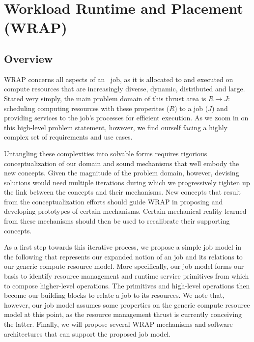 \section{Workload Runtime and Placement (WRAP)}

\subsection{Overview}

WRAP concerns all aspects
of an \ngrm\ job, as it is allocated to and executed on compute resources
that are increasingly diverse, dynamic, distributed and large.
Stated very simply, the main problem domain of this thrust
area is $R \rightarrow J$: scheduling computing resources
with these properites ($R$) to a job ($J$) and providing services
to the job's processes for efficient execution. As we zoom in on
this high-level problem statement, however,
we find ourself facing a highly complex set of requirements
and use cases.

Untangling these complexities into solvable forms requires
rigorious conceptualization of our domain and
sound mechanisms that well embody the new concepts.
Given the magnitude of the problem domain, however, devising
solutions would need multiple iterations during
which we progressively tighten up the link between
the concepts and their mechanisms. New concepts that result from
the conceptualization efforts
should guide WRAP in proposing and developing
prototypes of certain mechanisms. Certain
mechanical reality learned from these mechanisms should then be
used to recalibrate their supporting concepts.

As a first step towards this iterative process,
we propose a simple job model in the following that represents
our expanded notion of an job and its relations
to our generic compute resource model.
More specifically, our job model forms our basis to identify
resource management and runtime service primitives
from which to compose higher-level operations.
The primitives and high-level operations then
become our building blocks to relate a job
to its resources. We note that, however, our job model
assumes some properties on the generic
compute resource model at this point, as the resource management thrust is
currently conceiving the latter.
Finally, we will propose several WRAP mechanisms
and software architectures that can support the proposed job model.

